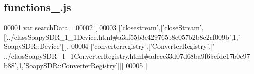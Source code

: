 \subsection{functions\+\_.\+js}
\label{functions__1_8js_source}

\begin{DoxyCode}
00001 var searchData=
00002 [
00003   [\textcolor{stringliteral}{'closestream'},[\textcolor{stringliteral}{'closeStream'},[\textcolor{stringliteral}{'../classSoapySDR\_1\_1Device.html#a3af55b3e429765b8e057b2b8c2af009b'},1,\textcolor{stringliteral}{'
      SoapySDR::Device'}]]],
00004   [\textcolor{stringliteral}{'converterregistry'},[\textcolor{stringliteral}{'ConverterRegistry'},[\textcolor{stringliteral}{'
      ../classSoapySDR\_1\_1ConverterRegistry.html#adccc33d07d68ba9f6befdc17b0c97b88'},1,\textcolor{stringliteral}{'SoapySDR::ConverterRegistry'}]]]
00005 ];
\end{DoxyCode}
